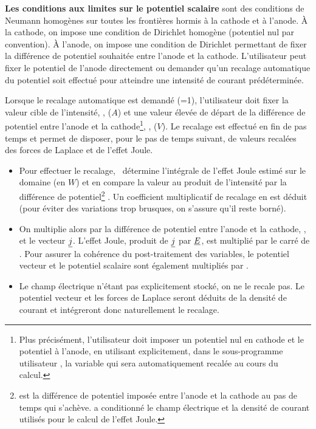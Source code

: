 {\bf Les conditions aux limites sur le potentiel scalaire} sont des conditions de
Neumann homog\`enes sur toutes les fronti\`eres hormis \`a la cathode et \`a
l'anode. \`A la cathode, on impose une condition de Dirichlet homog\`ene (potentiel nul par convention). \`A l'anode, on impose une
condition de Dirichlet permettant de fixer la diff\'erence de potentiel
souhait\'ee entre l'anode et la cathode. 
L'utilisateur peut fixer le potentiel de l'anode directement ou
demander qu'un recalage automatique du potentiel soit effectu\'e pour atteindre 
une intensit\'e de courant pr\'ed\'etermin\'ee. 

Lorsque le recalage automatique est demand\'e (=1), l'utilisateur doit fixer la 
valeur cible de l'intensit\'e, , ($A$) et une valeur \'elev\'ee 
de d\'epart 
de la diff\'erence de potentiel entre l'anode et la cathode\footnote{Plus pr\'ecis\'ement, l'utilisateur doit imposer un potentiel nul
en cathode et le potentiel  \`a l'anode, en utilisant explicitement, 
dans le sous-programme utilisateur , la variable  qui
sera automatiquement recal\'ee au cours du calcul.}, , ($V$). 
Le recalage est effectu\'e en fin de pas temps et permet de disposer, pour le pas
de temps suivant, de valeurs recal\'ees des forces de Laplace et de l'effet
Joule. 
\begin{itemize}
\item Pour effectuer le recalage, \CS\ d\'etermine l'int\'egrale de l'effet Joule 
estim\'e sur le domaine (en $W$) et en compare la
valeur au produit de l'intensit\'e  par la diff\'erence de
potentiel\footnote{ est la diff\'erence de
potentiel impos\'ee entre l'anode et la cathode au
pas de temps qui s'ach\`eve.  a conditionn\'e le champ \'electrique et
la densit\'e de courant utilis\'es pour le calcul de l'effet Joule.} . 
Un coefficient multiplicatif de recalage  en
est d\'eduit (pour \'eviter des variations trop brusques, 
on s'assure qu'il reste born\'e). %
\item On multiplie alors par  la
diff\'erence de potentiel entre l'anode et la cathode, , et le vecteur $\underline{j}$. L'effet
Joule, produit de $\underline{j}$ par $\underline{E}$, est multipli\'e par
le carr\'e de . Pour assurer la coh\'erence du post-traitement des
variables, le potentiel vecteur et le potentiel scalaire sont \'egalement
multipli\'es par . 
\item Le champ \'electrique n'\'etant pas explicitement
stock\'e, on ne le recale pas. Le potentiel vecteur et les forces de Laplace seront d\'eduits de la
densit\'e de courant et int\'egreront donc naturellement le recalage.   
\end{itemize}

